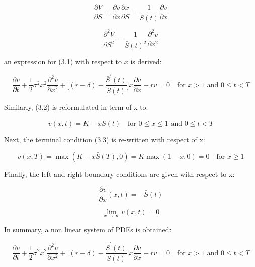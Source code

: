\begin{equation}
    \frac{\partial{V}}{\partial{S}} = \frac{\partial{v}}{\partial{x}} 
    \frac{\partial{x}}{\partial{S}} = 
    \frac{1}{\bar{S}(t)} \frac{\partial{v}}{\partial{x}}
\end{equation}

\begin{equation}
    \frac{\partial^2{V}}{\partial{S^2}} =
    \frac{1}{\bar{S}(t)^2} \frac{\partial^2{v}}{\partial{x}^2}
\end{equation}

an expression for (3.1) with respect to $x$ is derived:

\begin{equation}
    \frac{\partial{v}}{\partial{t}} + \frac{1}{2}\sigma^{2} x^2 \frac{\partial^2{v}}{\partial{x}^2} + \bigg[(r - \delta) - \frac{\bar{S}^\prime(t)}{\bar{S}(t)}\bigg]x\frac{\partial{v}}{\partial{x}} - rv = 0 \quad \text{for $x > 1$ and $0 \le t < T$}
\end{equation}

Similarly, (3.2) is reformulated in term of x to:

\begin{equation}
    v(x, t) = K - x\bar{S}(t) \quad  \text{for $0 \le x \le 1$ and $0 \le t < T$}
\end{equation}

Next, the terminal condition (3.3) is re-written with respect of x:

\begin{equation}
    v(x, T) = \max(K - x\bar{S}(T), 0) = K \max(1 - x, 0) = 0 \quad \text{for $x \ge 1$}
\end{equation}

Finally, the left and right boundary conditions are given with respect to x:

\begin{equation}
    \frac{\partial{v}}{\partial{x}}(x, t) = -\bar{S}(t)
\end{equation}

\begin{equation}
    \lim_{x \rightarrow \infty} v(x, t) = 0
\end{equation}

In summary, a non linear system of PDEs is obtained:

\begin{equation}
    \frac{\partial{v}}{\partial{t}} + \frac{1}{2}\sigma^{2} x^2 \frac{\partial^2{v}}{\partial{x}^2} + \bigg[(r - \delta) - \frac{\bar{S}^\prime(t)}{\bar{S}(t)}\bigg]x\frac{\partial{v}}{\partial{x}} - rv = 0 \quad \text{for $x > 1$ and $0 \le t < T$}
\end{equation}

